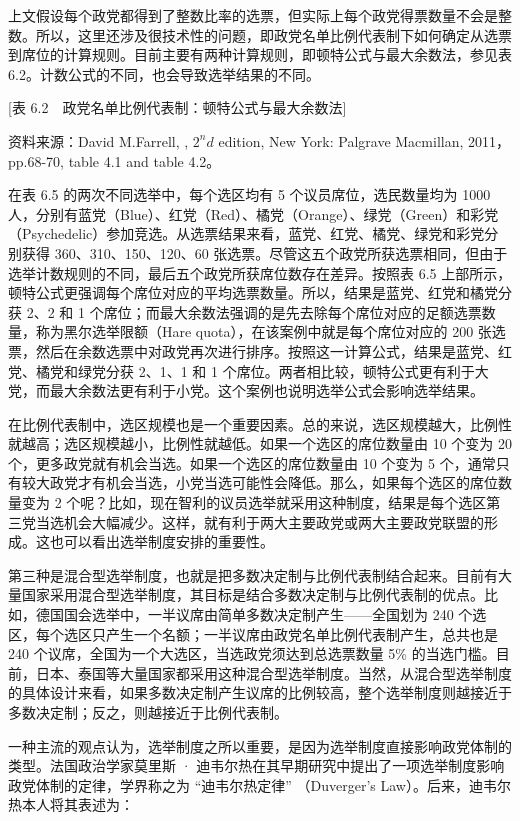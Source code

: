 上文假设每个政党都得到了整数比率的选票，但实际上每个政党得票数量不会是整数。所以，这里还涉及很技术性的问题，即政党名单比例代表制下如何确定从选票到席位的计算规则。目前主要有两种计算规则，即顿特公式与最大余数法，参见表 6.2。计数公式的不同，也会导致选举结果的不同。

[表 6.2　政党名单比例代表制：顿特公式与最大余数法]

资料来源：David M.Farrell, , $2^nd$ edition, New York: Palgrave Macmillan, 2011，pp.68-70, table 4.1 and table 4.2。

在表 6.5 的两次不同选举中，每个选区均有 5 个议员席位，选民数量均为 1000 人，分别有蓝党（Blue）、红党（Red）、橘党（Orange）、绿党（Green）和彩党（Psychedelic）参加竞选。从选票结果来看，蓝党、红党、橘党、绿党和彩党分别获得 360、310、150、120、60 张选票。尽管这五个政党所获选票相同，但由于选举计数规则的不同，最后五个政党所获席位数存在差异。按照表 6.5 上部所示，顿特公式更强调每个席位对应的平均选票数量。所以，结果是蓝党、红党和橘党分获 2、2 和 1 个席位；而最大余数法强调的是先去除每个席位对应的足额选票数量，称为黑尔选举限额（Hare quota），在该案例中就是每个席位对应的 200 张选票，然后在余数选票中对政党再次进行排序。按照这一计算公式，结果是蓝党、红党、橘党和绿党分获 2、1、1 和 1 个席位。两者相比较，顿特公式更有利于大党，而最大余数法更有利于小党。这个案例也说明选举公式会影响选举结果。

在比例代表制中，选区规模也是一个重要因素。总的来说，选区规模越大，比例性就越高；选区规模越小，比例性就越低。如果一个选区的席位数量由 10 个变为 20 个，更多政党就有机会当选。如果一个选区的席位数量由 10 个变为 5 个，通常只有较大政党才有机会当选，小党当选可能性会降低。那么，如果每个选区的席位数量变为 2 个呢？比如，现在智利的议员选举就采用这种制度，结果是每个选区第三党当选机会大幅减少。这样，就有利于两大主要政党或两大主要政党联盟的形成。这也可以看出选举制度安排的重要性。

第三种是混合型选举制度，也就是把多数决定制与比例代表制结合起来。目前有大量国家采用混合型选举制度，其目标是结合多数决定制与比例代表制的优点。比如，德国国会选举中，一半议席由简单多数决定制产生——全国划为 240 个选区，每个选区只产生一个名额；一半议席由政党名单比例代表制产生，总共也是 240 个议席，全国为一个大选区，当选政党须达到总选票数量 5\% 的当选门槛。目前，日本、泰国等大量国家都采用这种混合型选举制度。当然，从混合型选举制度的具体设计来看，如果多数决定制产生议席的比例较高，整个选举制度则越接近于多数决定制；反之，则越接近于比例代表制。

一种主流的观点认为，选举制度之所以重要，是因为选举制度直接影响政党体制的类型。法国政治学家莫里斯 · 迪韦尔热在其早期研究中提出了一项选举制度影响政党体制的定律，学界称之为 “迪韦尔热定律” （Duverger's Law）。后来，迪韦尔热本人将其表述为：

